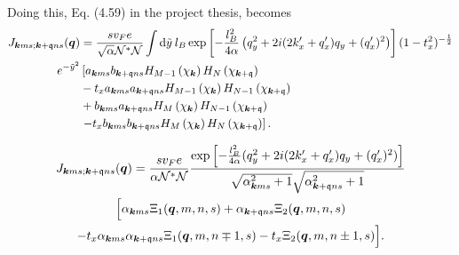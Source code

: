 Doing this, Eq. (4.59)  in the project thesis, becomes
\begin{equation}
  \label{eq:28}
  \begin{split}
    J_{\bm{k}ms; \bm{k}+\mathfrak{q} ns}(\bm{q}) &=
    \frac{s v_F e}{\sqrt{\alpha } \mathcal{N}^{*}\mathcal{N}} \int \mathrm{d}\tilde{y} \: l_B
    \exp \left[
      -\frac{l_{B}^2}{4 \alpha } \left(q_{y}^2 + 2i (2 k' _x + q' _x) q_{y} + (q'_x)^2 \right)
    \right]
    (1-t_{x}^2)^{-\frac{1}{2}}\\
    e^{-\tilde{y}^2}
   &\left[
    a_{\bm{k}ms}b_{\bm{k} + \mathfrak{q} ns}
    H_{M-1} \left(  \chi_{\bm{k}} \right)
    H_N\left( \chi_{\bm{k} + \mathfrak{q}} \right) \right.\\
    &- t_{x} a_{\bm{k}ms}a_{\bm{k} + \mathfrak{q} ns}
    H_{M-1} \left( \chi_{\bm{k}} \right)
    H_{N-1}\left( \chi_{\bm{k} + \mathfrak{q}} \right)\\
   & +
    b_{\bm{k}ms} a_{\bm{k} + \mathfrak{q} ns}
    H_M \left( \chi_{\bm{k}} \right)
    H_{N-1} \left( \chi_{\bm{k} + \mathfrak{q}} \right)\\
    &\left. - t_{x}
    b_{\bm{k}ms} b_{\bm{k} + \mathfrak{q} ns}
    H_M \left( \chi_{\bm{k}} \right)
    H_{N} \left(  \chi_{\bm{k} + \mathfrak{q}}\right)
    \right].
  \end{split}
\end{equation}

\begin{multline}
  J_{\bm{k} m s; \bm{k} + \mathfrak{q} n s} (\bm{q}) =
  \frac{s v_{F} e}{\alpha \mathcal{N}^{*}\mathcal{N}}
  \frac{
    \exp \left[
      -\frac{l_{B}^2}{4 \alpha } (q_{y}^2 + 2i (2 k'_x + q'_x) q_{y} + (q'_x)^2 )
    \right]
  }{
    \sqrt{\alpha _{\bm{k} m s}^2 + 1} \sqrt{ \alpha _{\bm{k} + \mathfrak{q} n s}^2 + 1 }
  } \\
  \Big[
   \alpha _{\bm{k} m s} \Xi_{1} (\bm{q}, m, n, s)
    + \alpha _{\bm{k} + \mathfrak{q} n s} \Xi _{2} (\bm{q}, m, n, s)\\
    - t_x \alpha _{\bm{k} m s} \alpha _{\bm{k} + \mathfrak{q} n s} \Xi _1(\bm{q}, m, n\mp 1, s)
    - t_x \Xi _2(\bm{q}, m, n\pm 1, s)
  \Big].
\end{multline}

